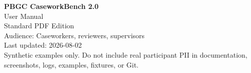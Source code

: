 \documentclass[11pt,oneside]{report}
\begin{document}
\sloppy

\begin{titlepage}
\centering
\vspace*{1.5in}
{\Huge\bfseries PBGC CaseworkBench 2.0\\[0.25in]}
{\LARGE User Manual\\[0.35in]}
{\Large Standard PDF Edition\\[0.75in]}
\vfill
{\large Audience: Caseworkers, reviewers, supervisors\\[0.1in]}
{\large Last updated: 2026-08-02\\[0.25in]}
\textcolor{pbgcgray}{Synthetic examples only. Do not include real participant PII in documentation, screenshots, logs, examples, fixtures, or Git.}
\end{titlepage}

\tableofcontents
\clearpage


\end{document}
